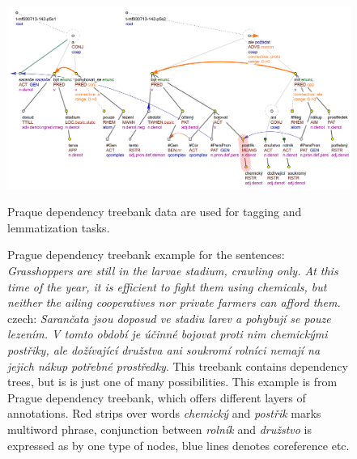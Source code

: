 \begin{figure}
\centering
\includegraphics[width=1\textwidth]{../img/prague_dep_treebank.png}
\caption{
Prague dependency treebank example \cite{PDT35} for the sentences:
\textit{Grasshoppers are still in the larvae stadium, crawling only. At this time of the year, it is efficient to fight them using chemicals, but neither the ailing cooperatives nor private farmers can afford them.} czech: \textit{Sarančata jsou doposud ve stadiu larev a pohybují se pouze lezením. V tomto období je účinné bojovat proti nim chemickými postřiky, ale dožívající družstva ani soukromí rolníci nemají na jejich nákup potřebné prostředky}. This treebank contains dependency trees, but is is just one of many possibilities. This example is from Prague dependency treebank, which offers different layers of annotations. Red strips over words \textit{chemický} and \textit{postřik} marks multiword phrase, conjunction between \textit{rolník} and \textit{družstvo} is expressed as by one type of nodes, blue lines denotes coreference etc.} Praque dependency treebank data are used for tagging and lemmatization tasks.
\label{fig:pdt}
\end{figure}

